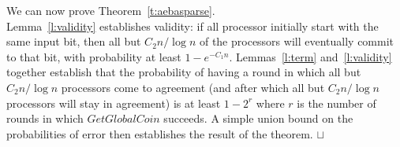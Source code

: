 \documentclass[letterpaper,11pt]{article}
\newcommand{\sq}{\hbox{\rlap{$\sqcap$}$\sqcup$}}
\newcommand{\qed}{\hspace*{\fill}\sq}
\newenvironment{proof}{\noindent {\bf Proof:}}{\qed\par\vskip 4mm\par}
\begin{document}
We can now prove Theorem~\ref{t:aebasparse}.\\
\begin{proof}
Lemma~\ref{l:validity} establishes validity: if all processor initially start with the same input bit, then all but $C_{2}n/ \log n$ of the processors will eventually commit to that bit, with probability at least $1-e^{-C_{1}n}$.  Lemmas~\ref{l:term} and~\ref{l:validity} together establish that the probability of having a round in which all but $C_{2}n/ \log n$ processors come to agreement (and after which all but $C_{2}n/ \log n$ processors  will stay in agreement) is at least $1-2^{r}$ where $r$ is the number of rounds in which $GetGlobalCoin$ succeeds.  A simple union bound on the probabilities of error then establishes the result of the theorem.
\end{proof}
\end{document}
